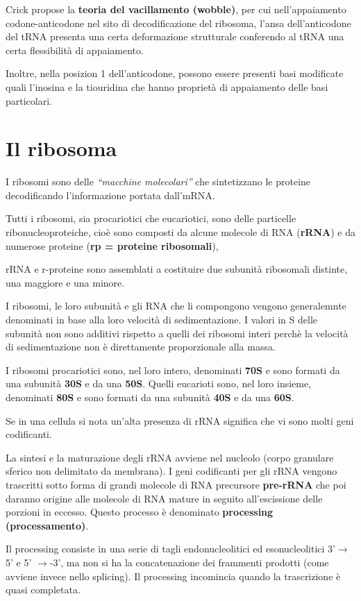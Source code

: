 \documentclass[11pt]{book}
\begin{document}
Crick propose la \textbf{teoria del vacillamento (wobble)}, per cui
nell'appaiamento codone-anticodone nel sito di decodificazione del
ribosoma, l'ansa dell'anticodone del tRNA presenta una certa
deformazione strutturale conferendo al tRNA una certa flessibilità di
appaiamento.

Inoltre, nella posizion 1 dell'anticodone, possono essere presenti basi
modificate quali l'inosina e la tiouridina che hanno proprietà di
appaiamento delle basi particolari.

\section{Il ribosoma}\label{il-ribosoma}

I ribosomi sono delle \emph{``macchine molecolari''} che sintetizzano le
proteine decodificando l'informazione portata dall'mRNA.

Tutti i ribosomi, sia procariotici che eucariotici, sono delle
particelle ribonucleoproteiche, cioè sono composti da alcune molecole di
RNA (\textbf{rRNA}) e da numerose proteine (\textbf{rp = proteine
ribosomali}),

rRNA e r-proteine sono assemblati a costituire due subunità ribosomali
distinte, una maggiore e una minore.

I ribosomi, le loro subunità e gli RNA che li compongono vengono
generalemnte denominati in base alla loro velocità di sedimentazione. I
valori in S delle subunità non sono additivi rispetto a quelli dei
ribosomi interi perchè la velocità di sedimentazione non è direttamente
proporzionale alla massa.

I ribosomi procariotici sono, nel loro intero, denominati \textbf{70S} e
sono formati da una subunità \textbf{30S} e da una \textbf{50S}. Quelli
eucarioti sono, nel loro insieme, denominati \textbf{80S} e sono formati
da una subunità \textbf{40S} e da una \textbf{60S}.

Se in una cellula si nota un'alta presenza di rRNA significa che vi sono
molti geni codificanti.

La sintesi e la maturazione degli rRNA avviene nel nucleolo (corpo
granulare sferico non delimitato da membrana). I geni codificanti per
gli rRNA vengono trascritti sotto forma di grandi molecole di RNA
precursore \textbf{pre-rRNA} che poi daranno origine alle molecole di
RNA mature in seguito all'escissione delle porzioni in eccesso. Questo
processo è denominato \textbf{processing (processamento)}.

Il processing consiste in una serie di tagli endonucleolitici ed
esonucleolitici 3'\(\rightarrow\) 5' e 5' \(\rightarrow\)-3', ma non si
ha la concatenazione dei frammenti prodotti (come avviene invece nello
splicing). Il processing incomincia quando la trascrizione è quasi
completata.
\end{document}
